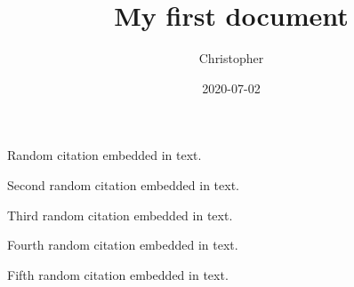 \documentclass{article}
\title{My first document}
\date{2020-07-02}
\author{Christopher}
\begin{document}
	
	Random citation \autocite[1]{DUMMY:1} embedded in text.
	
	Second random citation \autocite[1]{ARTICLE:1} embedded in text.
	
	\newpage
	
	Third random citation \autocite[2]{BOOK:1} embedded in text.
	
	Fourth random citation \autocite[2]{BOOK:2} embedded in text.
	
	Fifth random citation \autocite[2]{WEBSITE:1} embedded in text.
	
	\newpage
	
\end{document}

